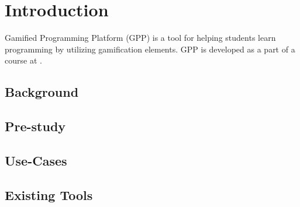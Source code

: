 \chapter{Introduction}
Gamified Programming Platform (GPP) is a tool for helping students learn programming by utilizing gamification elements. GPP is developed as a part of a course at \LTU.

\section{Background}


\section{Pre-study}


\section{Use-Cases}


\section{Existing Tools}

